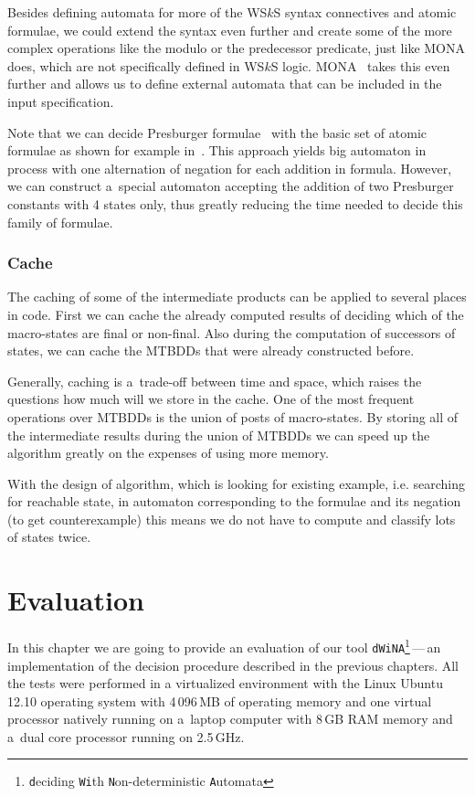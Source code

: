  Besides defining automata for more of the WS$k$S syntax connectives and atomic
 formulae, we could extend the syntax even further and create some of the more
 complex operations like the modulo or the predecessor predicate, just like
 \textsc{MONA} does, which are not specifically defined in WS$k$S logic.
 \textsc{MONA}~\cite{mona-secrets} takes this even further and allows us to
 define external automata that can be included in the input specification.
 
 Note that we can decide Presburger formulae~\cite{presburger} with the basic
 set of atomic formulae as shown for example in~\cite{nfa}. This
 approach yields big automaton in process with one alternation of negation for
 each addition in formula. However, we can construct a~special automaton
 accepting the addition of two Presburger constants with 4 states only, thus
 greatly reducing the time needed to decide this family of formulae.
 
 \subsection{Cache}
 
 The caching of some of the intermediate products can be applied to several
 places in code. First we can cache the already computed results of deciding
 which of the macro-states are final or non-final. Also during the computation
 of successors of states, we can cache the MTBDDs that were already constructed
 before.
 
 Generally, caching is a~trade-off between time and space, which raises the
 questions how much will we store in the cache. One of the most frequent
 operations over MTBDDs is the union of posts of macro-states. By storing all of
 the intermediate results during the union of MTBDDs we can speed up the
 algorithm greatly on the expenses of using more memory.
  
 With the design of algorithm, which is looking for existing example, i.e.
 searching for reachable state, in automaton corresponding to the formulae and
 its negation (to get counterexample) this means we do not have to compute
 and classify lots of states twice.

\chapter{Evaluation}\label{evalChapter}

In this chapter we are going to provide an evaluation of our tool
\texttt{dWiNA}\footnote{\texttt{d}eciding \texttt{Wi}th
\texttt{N}on-deterministic \texttt{A}utomata}\,---\,an implementation of
the decision procedure described in the previous chapters.
All the tests were performed in a virtualized environment with the Linux Ubuntu 12.10 operating
system with 4\,096\,MB of operating memory and one virtual processor natively
running on a~laptop computer with 8\,GB RAM memory and a~dual core processor
running on 2.5\,GHz.


